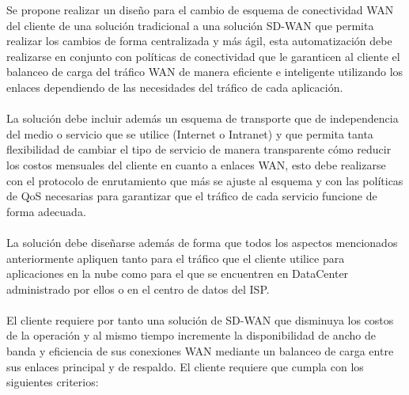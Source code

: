 Se propone realizar un diseño para el cambio de esquema de conectividad WAN del cliente de una solución tradicional a una solución SD-WAN que permita realizar los cambios de forma centralizada y más ágil, esta automatización debe realizarse en conjunto con políticas de conectividad que le garanticen al cliente el balanceo de carga del tráfico WAN de manera eficiente e inteligente utilizando los enlaces dependiendo de las necesidades del tráfico de cada aplicación.
\\
\\
	La solución debe incluir además un esquema de transporte que de independencia del medio o servicio que se utilice (Internet o Intranet) y que permita tanta flexibilidad de cambiar el tipo de servicio de manera transparente cómo reducir los costos mensuales del cliente en cuanto a enlaces WAN, esto debe realizarse con el protocolo de enrutamiento que más se ajuste al esquema y con las políticas de QoS necesarias para garantizar que el tráfico de cada servicio funcione de forma adecuada.
\\
\\
	La solución debe diseñarse además de forma que todos los aspectos mencionados anteriormente apliquen tanto para el tráfico que el cliente utilice para aplicaciones en la nube como para el que se encuentren en DataCenter administrado por ellos o en el centro de datos del ISP.
\\
\\
	El cliente requiere por tanto una solución de SD-WAN que disminuya los costos de la operación y al mismo tiempo incremente la disponibilidad de ancho de banda y eficiencia de sus conexiones WAN mediante un balanceo de carga entre sus enlaces principal y de respaldo. El cliente requiere que cumpla con los siguientes criterios:

